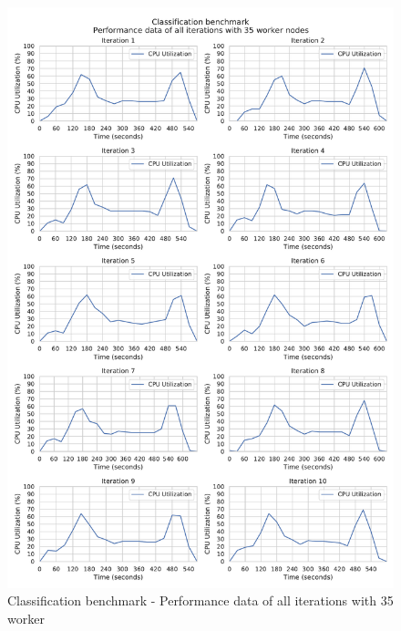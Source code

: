 \begin{figure}[h]
\centering
\includegraphics[scale=0.5]{images/appendix/evaluation_data/classification_benchmark/classification_35_worker_cpu_performance}
\caption{Classification benchmark - Performance data of all iterations with 35 worker}
\label{fig:appendix_eval_classification_static35}
\end{figure}

